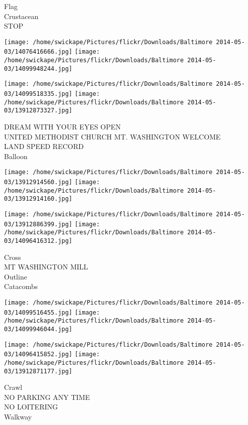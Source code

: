 \documentclass[10pt,letterpaper]{article}
\begin{document}
Flag\\
Crustacean\\
STOP\\
\pagebreak

\texttt{[image: /home/swickape/Pictures/flickr/Downloads/Baltimore 2014-05-03/14076416666.jpg]}
\texttt{[image: /home/swickape/Pictures/flickr/Downloads/Baltimore 2014-05-03/14099948244.jpg]}

\texttt{[image: /home/swickape/Pictures/flickr/Downloads/Baltimore 2014-05-03/14099518335.jpg]}
\texttt{[image: /home/swickape/Pictures/flickr/Downloads/Baltimore 2014-05-03/13912873327.jpg]}

DREAM WITH YOUR EYES OPEN\\
UNITED METHODIST CHURCH MT. WASHINGTON WELCOME\\
LAND SPEED RECORD\\
Balloon\\
\pagebreak

\texttt{[image: /home/swickape/Pictures/flickr/Downloads/Baltimore 2014-05-03/13912914560.jpg]}
\texttt{[image: /home/swickape/Pictures/flickr/Downloads/Baltimore 2014-05-03/13912914160.jpg]}

\texttt{[image: /home/swickape/Pictures/flickr/Downloads/Baltimore 2014-05-03/13912886399.jpg]}
\texttt{[image: /home/swickape/Pictures/flickr/Downloads/Baltimore 2014-05-03/14096416312.jpg]}

Cross\\
MT WASHINGTON MILL\\
Outline\\
Catacombs\\
\pagebreak

\texttt{[image: /home/swickape/Pictures/flickr/Downloads/Baltimore 2014-05-03/14099516455.jpg]}
\texttt{[image: /home/swickape/Pictures/flickr/Downloads/Baltimore 2014-05-03/14099946044.jpg]}

\texttt{[image: /home/swickape/Pictures/flickr/Downloads/Baltimore 2014-05-03/14096415852.jpg]}
\texttt{[image: /home/swickape/Pictures/flickr/Downloads/Baltimore 2014-05-03/13912871177.jpg]}

Crawl\\
NO PARKING ANY TIME\\
NO LOITERING\\
Walkway\\
\pagebreak
\end{document}
